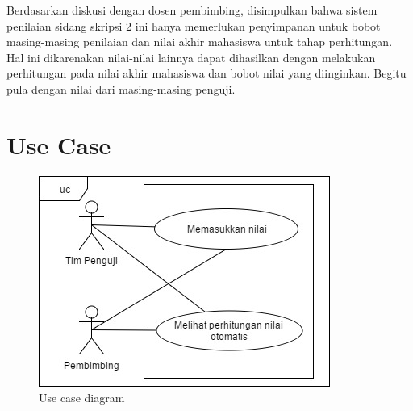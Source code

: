 	Berdasarkan diskusi dengan dosen pembimbing, disimpulkan bahwa sistem penilaian sidang skripsi 2 ini hanya memerlukan penyimpanan untuk bobot masing-masing penilaian dan nilai akhir mahasiswa untuk tahap perhitungan. Hal ini dikarenakan nilai-nilai lainnya dapat dihasilkan dengan melakukan perhitungan pada  nilai akhir mahasiswa dan bobot nilai yang diinginkan. Begitu pula dengan nilai dari masing-masing penguji.
	
\section{Use Case}
\label{sec: usecaseDiagram}

	\begin{figure}[H]
		\centering
		\includegraphics[scale=0.75]{Gambar/usecase}
		\caption{Use case diagram}
		\label{fig:usecase}
	\end{figure}
	
